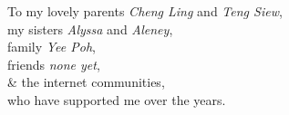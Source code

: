 \thispagestyle{empty}
    \null{}
        \begin{flushright}
                To my lovely parents \textit{Cheng Ling} and \textit{Teng Siew},\\
                my sisters \textit{Alyssa} and \textit{Aleney},\\
                family \textit{Yee Poh},\\
                friends \textit{none yet},\\
                \& the internet communities,\\
                who have supported me over the years.
        \end{flushright}
\null
